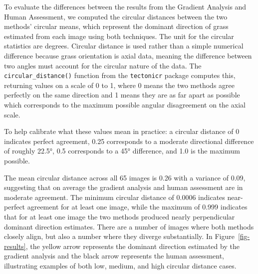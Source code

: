 \documentclass[
]{article}
\newenvironment{Shaded}{\begin{snugshade}}{\end{snugshade}}
\newcommand{\AttributeTok}[1]{\textcolor[rgb]{0.40,0.45,0.13}{#1}}
\newcommand{\CommentTok}[1]{\textcolor[rgb]{0.37,0.37,0.37}{#1}}
\newcommand{\ConstantTok}[1]{\textcolor[rgb]{0.56,0.35,0.01}{#1}}
\newcommand{\FunctionTok}[1]{\textcolor[rgb]{0.28,0.35,0.67}{#1}}
\newcommand{\NormalTok}[1]{\textcolor[rgb]{0.00,0.23,0.31}{#1}}
\newcommand{\OtherTok}[1]{\textcolor[rgb]{0.00,0.23,0.31}{#1}}
\newcommand{\SpecialCharTok}[1]{\textcolor[rgb]{0.37,0.37,0.37}{#1}}
\newcommand{\StringTok}[1]{\textcolor[rgb]{0.13,0.47,0.30}{#1}}
\begin{document}
To evaluate the differences between the results from the Gradient
Analysis and Human Assessment, we computed the circular distances
between the two methods' circular means, which represent the dominant
direction of grass estimated from each image using both techniques. The
unit for the circular statistics are degrees. Circular distance is used
rather than a simple numerical difference because grass orientation is
axial data, meaning the difference between two angles must account for
the circular nature of the data. The \texttt{circular\_distance()}
function from the \texttt{tectonicr} package computes this, returning
values on a scale of 0 to 1, where 0 means the two methods agree
perfectly on the same direction and 1 means they are as far apart as
possible which corresponds to the maximum possible angular disagreement
on the axial scale.

\begin{Shaded}
\end{Shaded}

To help calibrate what these values mean in practice: a circular
distance of 0 indicates perfect agreement, 0.25 corresponds to a
moderate directional difference of roughly 22.5°, 0.5 corresponds to a
45° difference, and 1.0 is the maximum possible.

The mean circular distance across all 65 images is 0.26 with a variance
of 0.09, suggesting that on average the gradient analysis and human
assessment are in moderate agreement. The minimum circular distance of
0.0006 indicates near-perfect agreement for at least one image, while
the maximum of 0.999 indicates that for at least one image the two
methods produced nearly perpendicular dominant direction estimates.
There are a number of images where both methods closely align, but also
a number where they diverge substantially. In Figure~\ref{fig-results},
the yellow arrow represents the dominant direction estimated by the
gradient analysis and the black arrow represents the human assessment,
illustrating examples of both low, medium, and high circular distance
cases.
\end{document}
